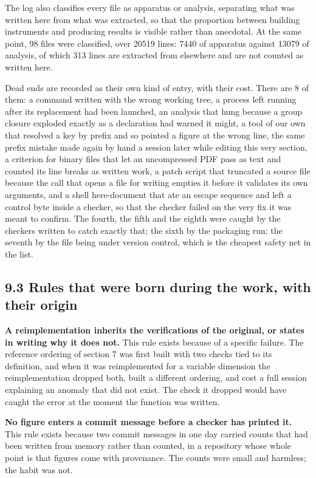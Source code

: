 \documentclass[11pt,a4paper]{article}
\begin{document}
The log also classifies every file as apparatus or analysis, separating what was written here from what was extracted, so that the proportion between building instruments and producing results is visible rather than anecdotal. At the same point, 98 files were classified, over 20519 lines: 7440 of apparatus against 13079 of analysis, of which 313 lines are extracted from elsewhere and are not counted as written here.

Dead ends are recorded as their own kind of entry, with their cost. There are 8 of them: a command written with the wrong working tree, a process left running after its replacement had been launched, an analysis that hung because a group closure exploded exactly as a declaration had warned it might, a tool of our own that resolved a key by prefix and so pointed a figure at the wrong line, the same prefix mistake made again by hand a session later while editing this very section, a criterion for binary files that let an uncompressed PDF pass as text and counted its line breaks as written work, a patch script that truncated a source file because the call that opens a file for writing empties it before it validates its own arguments, and a shell here-document that ate an escape sequence and left a control byte inside a checker, so that the checker failed on the very fix it was meant to confirm. The fourth, the fifth and the eighth were caught by the checkers written to catch exactly that; the sixth by the packaging run; the seventh by the file being under version control, which is the cheapest safety net in the list.

\subsection*{9.3 Rules that were born during the work, with their origin}

\textbf{A reimplementation inherits the verifications of the original, or states in writing why it does not.} This rule exists because of a specific failure. The reference ordering of section 7 was first built with two checks tied to its definition, and when it was reimplemented for a variable dimension the reimplementation dropped both, built a different ordering, and cost a full session explaining an anomaly that did not exist. The check it dropped would have caught the error at the moment the function was written.

\textbf{No figure enters a commit message before a checker has printed it.} This rule exists because two commit messages in one day carried counts that had been written from memory rather than counted, in a repository whose whole point is that figures come with provenance. The counts were small and harmless; the habit was not.
\end{document}
